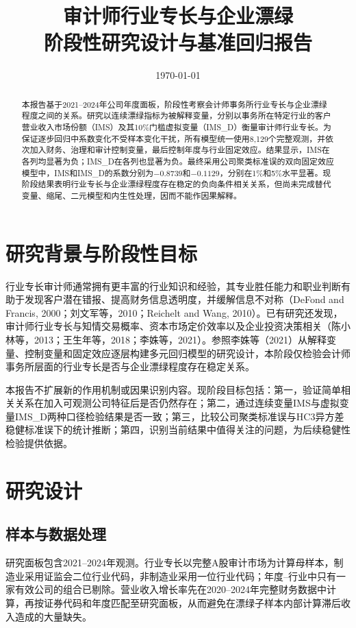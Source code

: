 \documentclass[UTF8,12pt,a4paper]{ctexart}
\title{审计师行业专长与企业漂绿\\阶段性研究设计与基准回归报告}
\author{}
\date{\today}
\begin{document}
\maketitle

\begin{abstract}
本报告基于2021--2024年公司年度面板，阶段性考察会计师事务所行业专长与企业漂绿程度之间的关系。研究以连续漂绿指标为被解释变量，分别以事务所在特定行业的客户营业收入市场份额（IMS）及其10\%门槛虚拟变量（IMS\_D）衡量审计师行业专长。为保证逐步回归中系数变化不受样本变化干扰，所有模型统一使用8,129个完整观测，并依次加入财务、治理和审计控制变量，最后控制年度与行业固定效应。结果显示，IMS在各列均显著为负；IMS\_D在各列也显著为负。最终采用公司聚类标准误的双向固定效应模型中，IMS和IMS\_D的系数分别为$-0.8739$和$-0.1129$，分别在1\%和5\%水平显著。现阶段结果表明行业专长与企业漂绿程度存在稳定的负向条件相关关系，但尚未完成替代变量、缩尾、二元模型和内生性处理，因而不能作因果解释。
\end{abstract}

\section{研究背景与阶段性目标}

行业专长审计师通常拥有更丰富的行业知识和经验，其专业胜任能力和职业判断有助于发现客户潜在错报、提高财务信息透明度，并缓解信息不对称（DeFond and Francis, 2000；刘文军等，2010；Reichelt and Wang, 2010）。已有研究还发现，审计师行业专长与知情交易概率、资本市场定价效率以及企业投资决策相关（陈小林等，2013；王生年等，2018；李姝等，2021）。参照李姝等（2021）从解释变量、控制变量和固定效应逐层构建多元回归模型的研究设计，本阶段仅检验会计师事务所层面的行业专长是否与企业漂绿程度存在稳定关系。

本报告不扩展新的作用机制或因果识别内容。现阶段目标包括：第一，验证简单相关关系在加入可观测公司特征后是否仍然存在；第二，通过连续变量IMS与虚拟变量IMS\_D两种口径检验结果是否一致；第三，比较公司聚类标准误与HC3异方差稳健标准误下的统计推断；第四，识别当前结果中值得关注的问题，为后续稳健性检验提供依据。

\section{研究设计}

\subsection{样本与数据处理}

研究面板包含2021--2024年观测。行业专长以完整A股审计市场为计算母样本，制造业采用证监会二位行业代码，非制造业采用一位行业代码；年度--行业中只有一家有效公司的组合已剔除。营业收入增长率先在2020--2024年完整财务数据中计算，再按证券代码和年度匹配至研究面板，从而避免在漂绿子样本内部计算滞后收入造成的大量缺失。
\end{document}
